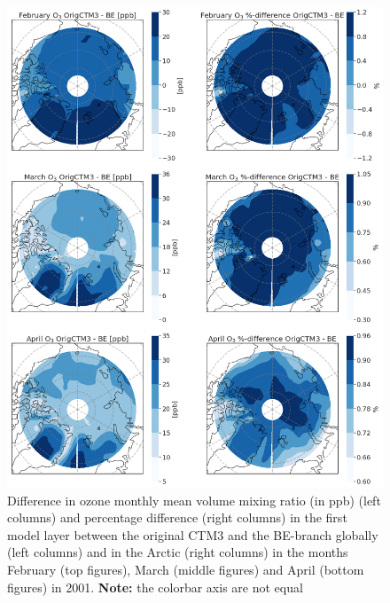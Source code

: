 \begin{figure}[h]
    \centering
    \includegraphics[width = \linewidth]{Chapter6_Results/images/Orig_BE_comp/polar_VMRperc_FebApr_2001.png}
    \caption{Difference in ozone monthly mean volume mixing ratio (in ppb) (left columns) and percentage difference (right columns) in the first model layer between the original CTM3 and the BE-branch globally (left columns) and in the Arctic (right columns) in the months February (top figures), March (middle figures) and April (bottom figures) in 2001. \textbf{Note:} the colorbar axis are not equal}
    \label{fig:BE_origPD_vmrperc_FebApr}
\end{figure}